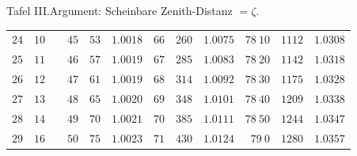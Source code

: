 \begin{GaussVIRefractionPlate}{Tafel III.\quad Argument: Scheinbare Zenith-Distanz $=\zeta$.}
{\begin{tabular}{r|r|r||r|r|r||r|r|r||r|r|r}
$24$ & $10$ &  & $45$ & $53$ & $1.0018$ & $66$ & $260$ & $1.0075$ & $78\ 10$ & $1112$ & $1.0308$\\
$25$ & $11$ &  & $46$ & $57$ & $1.0019$ & $67$ & $285$ & $1.0083$ & $78\ 20$ & $1142$ & $1.0318$\\
$26$ & $12$ &  & $47$ & $61$ & $1.0019$ & $68$ & $314$ & $1.0092$ & $78\ 30$ & $1175$ & $1.0328$\\
$27$ & $13$ &  & $48$ & $65$ & $1.0020$ & $69$ & $348$ & $1.0101$ & $78\ 40$ & $1209$ & $1.0338$\\
$28$ & $14$ &  & $49$ & $70$ & $1.0021$ & $70$ & $385$ & $1.0111$ & $78\ 50$ & $1244$ & $1.0347$\\
$29$ & $16$ &  & $50$ & $75$ & $1.0023$ & $71$ & $430$ & $1.0124$ & $79\ 0$ & $1280$ & $1.0357$
\end{tabular}}
\end{GaussVIRefractionPlate}
\clearpage
\endgroup
